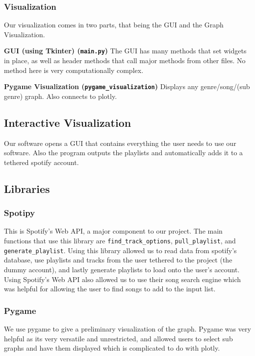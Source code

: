 \documentclass[fontsize=11pt]{article}
\begin{document}
    \subsubsection*{Visualization}
    Our visualization comes in two parts, that being the GUI and the Graph Visualization.

    \textbf{GUI (using Tkinter) (\texttt{main.py})}
    The GUI has many methods that set widgets in place, as well as header methods that call major methods from other files. No method here is very computationally complex.


    \textbf{Pygame Visualization (\texttt{pygame\_visualization})}
    Displays any genre/song/(sub genre) graph. Also connects to plotly.

    \subsection*{Interactive Visualization}
    Our software opens a GUI that contains everything the user needs to use our software. \vspace{4mm} \newline
    Also the program outputs the playlists and automatically adds it to a tethered spotify account.

    \subsection*{Libraries}
    \subsubsection*{Spotipy}
    This is Spotify's Web API, a major component to our project. The main functions that use this library are \texttt{find\_track\_options}, \texttt{pull\_playlist}, and \texttt{generate\_playlist}. Using this library allowed us to read data from spotify's database, use playlists and tracks from the user tethered to the project (the dummy account), and lastly generate playlists to load onto the user's account. Using Spotify's Web API also allowed us to use their song search engine which was helpful for allowing the user to find songs to add to the input list.

    \subsubsection*{Pygame}
    We use pygame to give a preliminary visualization of the graph. Pygame was very helpful as its very versatile and unrestricted, and allowed users to select sub graphs and have them displayed which is complicated to do with plotly.
\end{document}
